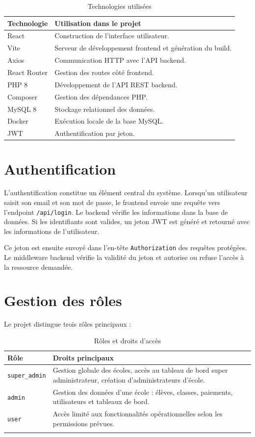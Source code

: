 \documentclass[12pt,a4paper]{report}
\begin{document}
\begin{table}[H]
\centering
\begin{tabular}{|p{4cm}|p{9cm}|}
\hline
\textbf{Technologie} & \textbf{Utilisation dans le projet} \\
\hline
React & Construction de l'interface utilisateur. \\
\hline
Vite & Serveur de développement frontend et génération du build. \\
\hline
Axios & Communication HTTP avec l'API backend. \\
\hline
React Router & Gestion des routes côté frontend. \\
\hline
PHP 8 & Développement de l'API REST backend. \\
\hline
Composer & Gestion des dépendances PHP. \\
\hline
MySQL 8 & Stockage relationnel des données. \\
\hline
Docker & Exécution locale de la base MySQL. \\
\hline
JWT & Authentification par jeton. \\
\hline
\end{tabular}
\caption{Technologies utilisées}
\end{table}

\section{Authentification}

L'authentification constitue un élément central du système. Lorsqu'un utilisateur saisit son email et son mot de passe, le frontend envoie une requête vers l'endpoint \texttt{/api/login}. Le backend vérifie les informations dans la base de données. Si les identifiants sont valides, un jeton JWT est généré et retourné avec les informations de l'utilisateur.

Ce jeton est ensuite envoyé dans l'en-tête \texttt{Authorization} des requêtes protégées. Le middleware backend vérifie la validité du jeton et autorise ou refuse l'accès à la ressource demandée.

\section{Gestion des rôles}

Le projet distingue trois rôles principaux :

\begin{longtable}{|p{4cm}|p{10cm}|}
\hline
\textbf{Rôle} & \textbf{Droits principaux} \\
\hline
\texttt{super\_admin} & Gestion globale des écoles, accès au tableau de bord super administrateur, création d'administrateurs d'école. \\
\hline
\texttt{admin} & Gestion des données d'une école : élèves, classes, paiements, utilisateurs et tableaux de bord. \\
\hline
\texttt{user} & Accès limité aux fonctionnalités opérationnelles selon les permissions prévues. \\
\hline
\caption{Rôles et droits d'accès}
\end{longtable}
\end{document}
